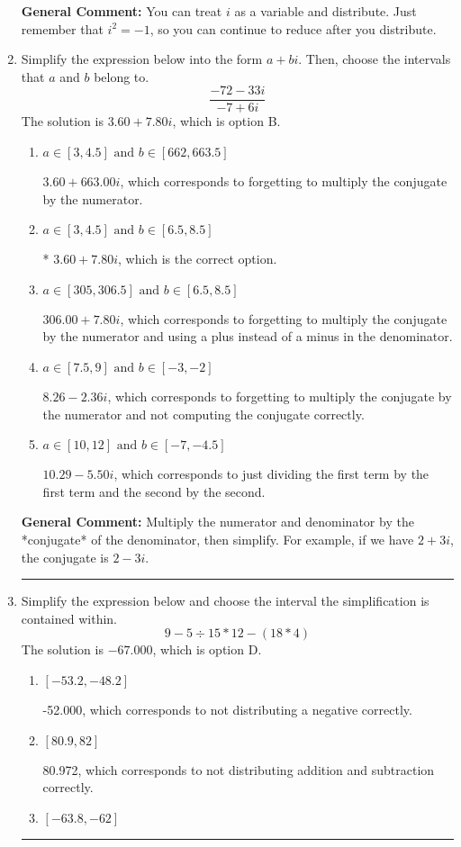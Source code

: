 \documentclass{extbook}[14pt]
\newcommand{\litem}[1]{\item #1

\rule{\textwidth}{0.4pt}}
\begin{document}
\begin{enumerate}
{\textbf{General Comment:} You can treat $i$ as a variable and distribute. Just remember that $i^2=-1$, so you can continue to reduce after you distribute.
}
\litem{
Simplify the expression below into the form $a+bi$. Then, choose the intervals that $a$ and $b$ belong to.
\[ \frac{-72 - 33 i}{-7 + 6 i} \]The solution is \( 3.60  + 7.80 i \), which is option B.\begin{enumerate}[label=\Alph*.]
\item \( a \in [3, 4.5] \text{ and } b \in [662, 663.5] \)

 $3.60  + 663.00 i$, which corresponds to forgetting to multiply the conjugate by the numerator.
\item \( a \in [3, 4.5] \text{ and } b \in [6.5, 8.5] \)

* $3.60  + 7.80 i$, which is the correct option.
\item \( a \in [305, 306.5] \text{ and } b \in [6.5, 8.5] \)

 $306.00  + 7.80 i$, which corresponds to forgetting to multiply the conjugate by the numerator and using a plus instead of a minus in the denominator.
\item \( a \in [7.5, 9] \text{ and } b \in [-3, -2] \)

 $8.26  - 2.36 i$, which corresponds to forgetting to multiply the conjugate by the numerator and not computing the conjugate correctly.
\item \( a \in [10, 12] \text{ and } b \in [-7, -4.5] \)

 $10.29  - 5.50 i$, which corresponds to just dividing the first term by the first term and the second by the second.
\end{enumerate}

\textbf{General Comment:} Multiply the numerator and denominator by the *conjugate* of the denominator, then simplify. For example, if we have $2+3i$, the conjugate is $2-3i$.
}
\litem{
Simplify the expression below and choose the interval the simplification is contained within.
\[ 9 - 5 \div 15 * 12 - (18 * 4) \]The solution is \( -67.000 \), which is option D.\begin{enumerate}[label=\Alph*.]
\item \( [-53.2, -48.2] \)

 -52.000, which corresponds to not distributing a negative correctly.
\item \( [80.9, 82] \)

 80.972, which corresponds to not distributing addition and subtraction correctly.
\item \( [-63.8, -62] \)


\end{enumerate}}
\end{enumerate}
\end{document}
